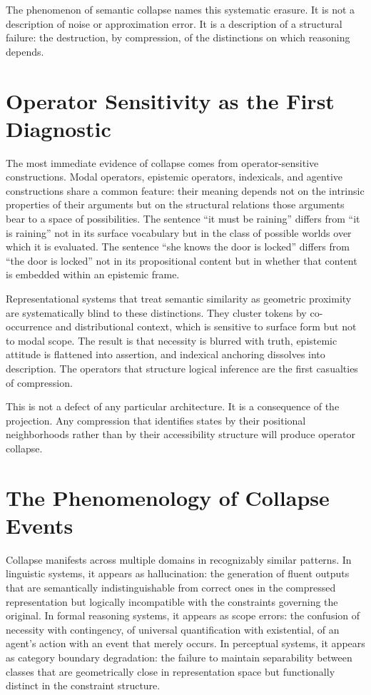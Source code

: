 \documentclass[12pt, oneside]{book}
\theoremstyle{plain-flyxion}
\theoremstyle{definition-flyxion}
\begin{document}
The phenomenon of semantic collapse names this systematic erasure. It is not a description
of noise or approximation error. It is a description of a structural failure: the
destruction, by compression, of the distinctions on which reasoning depends.

\section{Operator Sensitivity as the First Diagnostic}

The most immediate evidence of collapse comes from operator-sensitive constructions. Modal
operators, epistemic operators, indexicals, and agentive constructions share a common
feature: their meaning depends not on the intrinsic properties of their arguments but on
the structural relations those arguments bear to a space of possibilities. The sentence
``it must be raining'' differs from ``it is raining'' not in its surface vocabulary but in
the class of possible worlds over which it is evaluated. The sentence ``she knows the door
is locked'' differs from ``the door is locked'' not in its propositional content but in
whether that content is embedded within an epistemic frame.

Representational systems that treat semantic similarity as geometric proximity are
systematically blind to these distinctions. They cluster tokens by co-occurrence and
distributional context, which is sensitive to surface form but not to modal scope. The
result is that necessity is blurred with truth, epistemic attitude is flattened into
assertion, and indexical anchoring dissolves into description. The operators that
structure logical inference are the first casualties of compression.

This is not a defect of any particular architecture. It is a consequence of the
projection. Any compression that identifies states by their positional neighborhoods
rather than by their accessibility structure will produce operator collapse.

\section{The Phenomenology of Collapse Events}

Collapse manifests across multiple domains in recognizably similar patterns. In linguistic
systems, it appears as hallucination: the generation of fluent outputs that are
semantically indistinguishable from correct ones in the compressed representation but
logically incompatible with the constraints governing the original. In formal reasoning
systems, it appears as scope errors: the confusion of necessity with contingency, of
universal quantification with existential, of an agent's action with an event that merely
occurs. In perceptual systems, it appears as category boundary degradation: the failure to
maintain separability between classes that are geometrically close in representation space
but functionally distinct in the constraint structure.
\end{document}
